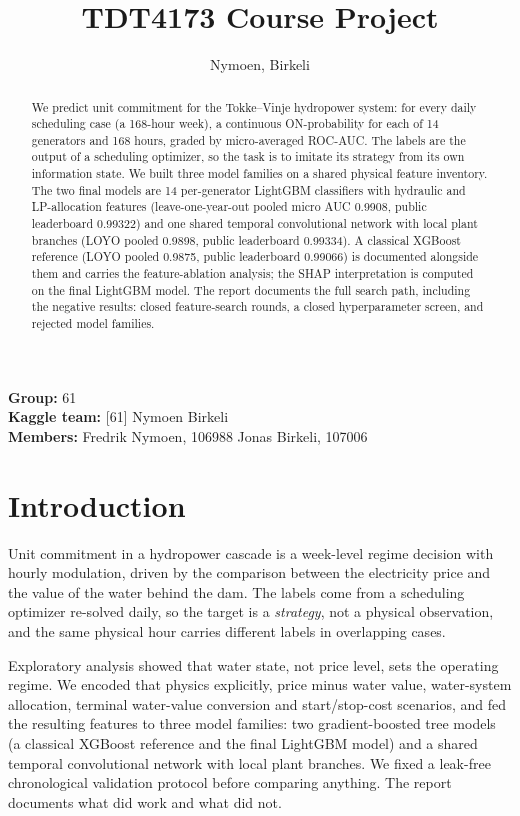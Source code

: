 \documentclass{article}
\title{TDT4173 Course Project}
\author{Nymoen, Birkeli}
\begin{document}
\maketitle

\noindent
\textbf{Group:} 61 \quad \\
\textbf{Kaggle team:} [61] Nymoen Birkeli \\
\textbf{Members:} Fredrik Nymoen, 106988 \; Jonas Birkeli, 107006

\begin{abstract}
We predict unit commitment for the Tokke--Vinje hydropower system: for
every daily scheduling case (a 168-hour week), a continuous ON-probability
for each of 14 generators and 168 hours, graded by micro-averaged ROC-AUC.
The labels are the output of a scheduling optimizer, so the task is to
imitate its strategy from its own information state. We built three model
families on a shared physical feature inventory. The two final models are
14 per-generator LightGBM classifiers with hydraulic and LP-allocation
features (leave-one-year-out pooled micro AUC 0.9908, public leaderboard
0.99322) and one shared temporal convolutional network with local plant
branches (LOYO pooled 0.9898, public leaderboard 0.99334). A classical
XGBoost reference (LOYO pooled 0.9875, public leaderboard 0.99066) is
documented alongside them and carries the feature-ablation analysis; the
SHAP interpretation is computed on the final LightGBM model. The report
documents the full search path,
including the negative results: closed feature-search rounds, a closed
hyperparameter screen, and rejected model families.
\end{abstract}

\section{Introduction}

Unit commitment in a hydropower cascade is a week-level regime decision
with hourly modulation, driven by the comparison between the electricity
price and the value of the water behind the dam. The labels come from a
scheduling optimizer re-solved daily, so the target is a \emph{strategy},
not a physical observation, and the same physical hour carries different
labels in overlapping cases.

Exploratory analysis showed that water state, not price level, sets the
operating regime. We encoded that physics explicitly, price minus water
value, water-system allocation, terminal water-value conversion and
start/stop-cost scenarios, and fed the resulting features to three model
families: two gradient-boosted tree models (a classical XGBoost reference
and the final LightGBM model) and a shared temporal convolutional network
with local plant branches. We fixed a leak-free chronological validation
protocol before comparing anything. The report documents what did work
and what did not.
\end{document}
